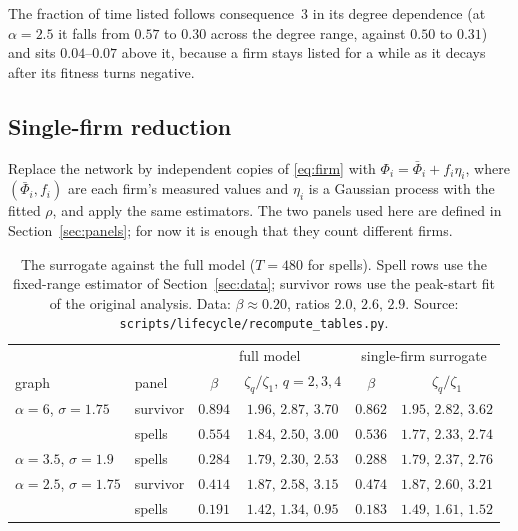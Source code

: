 \documentclass[11pt]{article}
\newcommand{\bPhi}{\bar\Phi}
\begin{document}
The fraction of time listed follows consequence~3 in its degree dependence (at $\alpha=2.5$ it
falls from $0.57$ to $0.30$ across the degree range, against $0.50$ to $0.31$) and sits
$0.04$--$0.07$ above it, because a firm stays listed for a while as it decays after its fitness
turns negative.

\subsection{Single-firm reduction}
\label{sec:reduction}

Replace the network by independent copies of \eqref{eq:firm} with $\Phi_i=\bPhi_i+f_i\eta_i$, where
$(\bPhi_i,f_i)$ are each firm's measured values and $\eta_i$ is a Gaussian process with the fitted
$\rho$, and apply the same estimators.  The two panels used here are defined in
Section~\ref{sec:panels}; for now it is enough that they count different firms.

\begin{table}[htbp]
\centering\small\setlength{\tabcolsep}{4pt}
\begin{tabular}{ll|cc|cc}
\toprule
 & & \multicolumn{2}{c|}{full model} & \multicolumn{2}{c}{single-firm surrogate}\\
graph & panel & $\beta$ & $\zeta_q/\zeta_1$, $q=2,3,4$ & $\beta$ & $\zeta_q/\zeta_1$\\
\midrule
$\alpha=6$, $\sigma=1.75$   & survivor & $0.894$ & $1.96,\,2.87,\,3.70$ & $0.862$ & $1.95,\,2.82,\,3.62$\\
                            & spells   & $0.554$ & $1.84,\,2.50,\,3.00$ & $0.536$ & $1.77,\,2.33,\,2.74$\\
$\alpha=3.5$, $\sigma=1.9$  & spells   & $0.284$ & $1.79,\,2.30,\,2.53$ & $0.288$ & $1.79,\,2.37,\,2.76$\\
$\alpha=2.5$, $\sigma=1.75$ & survivor & $0.414$ & $1.87,\,2.58,\,3.15$ & $0.474$ & $1.87,\,2.60,\,3.21$\\
                            & spells   & $0.191$ & $1.42,\,1.34,\,0.95$ & $0.183$ & $1.49,\,1.61,\,1.52$\\
\bottomrule
\end{tabular}
\caption{The surrogate against the full model ($T=480$ for spells).  Spell rows use the fixed-range
estimator of Section~\ref{sec:data}; survivor rows use the peak-start fit of the original analysis.
Data: $\beta\approx0.20$, ratios $2.0,\,2.6,\,2.9$.  Source: \texttt{scripts/lifecycle/recompute\_tables.py}.}
\label{tab:surrogate}
\end{table}
\end{document}
